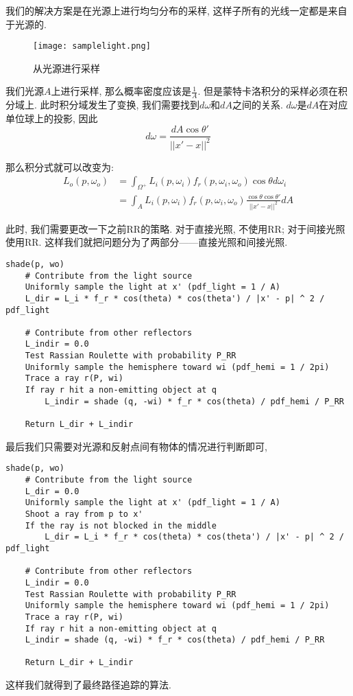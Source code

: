 我们的解决方案是在光源上进行均匀分布的采样, 这样子所有的光线一定都是来自于光源的. 

\begin{figure}[H]
	\centering
	\texttt{[image: samplelight.png]}
	\caption{从光源进行采样}
	\label{fig:samplelight}
\end{figure}

我们光源$A$上进行采样, 那么概率密度应该是$\frac{1}{A}$. 但是蒙特卡洛积分的采样必须在积分域上. 此时积分域发生了变换, 我们需要找到$d\omega$和$dA$之间的关系. $d\omega$是$dA$在对应单位球上的投影, 因此
\begin{equation}
	d\omega = \frac{dA\cos\theta'}{||x'-x||^2}
\end{equation}

那么积分式就可以改变为: 
\begin{equation}
	\begin{split}
		L_o(p,\omega_o)&=\int_{\Omega^+}L_i(p,\omega_i)f_r(p,\omega_i,\omega_o)\cos\theta d\omega_i\\
		&=\int_AL_i(p,\omega_i)f_r(p,\omega_i,\omega_o)\frac{\cos\theta\cos\theta'}{||x'-x||^2}dA
	\end{split}
\end{equation}

此时, 我们需要更改一下之前RR的策略. 对于直接光照, 不使用RR; 对于间接光照使用RR. 这样我们就把问题分为了两部分——直接光照和间接光照. 

\begin{lstlisting}[caption=采用光源上均匀分布渲染函数伪代码]
shade(p, wo)
	# Contribute from the light source
	Uniformly sample the light at x' (pdf_light = 1 / A)
	L_dir = L_i * f_r * cos(theta) * cos(theta') / |x' - p| ^ 2 / pdf_light
	
	# Contribute from other reflectors
	L_indir = 0.0
	Test Rassian Roulette with probability P_RR
	Uniformly sample the hemisphere toward wi (pdf_hemi = 1 / 2pi)
	Trace a ray r(P, wi)
	If ray r hit a non-emitting object at q
		L_indir = shade (q, -wi) * f_r * cos(theta) / pdf_hemi / P_RR
	
	Return L_dir + L_indir
\end{lstlisting}

最后我们只需要对光源和反射点间有物体的情况进行判断即可, 

\begin{lstlisting}[caption=渲染函数伪代码]
	shade(p, wo)
	# Contribute from the light source
	L_dir = 0.0
	Uniformly sample the light at x' (pdf_light = 1 / A)
	Shoot a ray from p to x'
	If the ray is not blocked in the middle
		L_dir = L_i * f_r * cos(theta) * cos(theta') / |x' - p| ^ 2 / pdf_light
	
	# Contribute from other reflectors
	L_indir = 0.0
	Test Rassian Roulette with probability P_RR
	Uniformly sample the hemisphere toward wi (pdf_hemi = 1 / 2pi)
	Trace a ray r(P, wi)
	If ray r hit a non-emitting object at q
	L_indir = shade (q, -wi) * f_r * cos(theta) / pdf_hemi / P_RR
	
	Return L_dir + L_indir
\end{lstlisting}

这样我们就得到了最终路径追踪的算法. 

